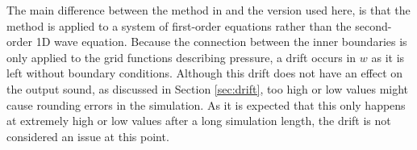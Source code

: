 The main difference between the method in \cite{Willemsen2021} and the version used here, is that the method is applied to a system of first-order equations rather than the second-order 1D wave equation. Because the connection between the inner boundaries is only applied to the grid functions describing pressure, a drift occurs in $w$ as it is left without boundary conditions. Although this drift does not have an effect on the output sound, as discussed in Section \ref{sec:drift}, too high or low values might cause rounding errors in the simulation. As it is expected that this only happens at extremely high or low values after a long simulation length, the drift is not considered an issue at this point. 



